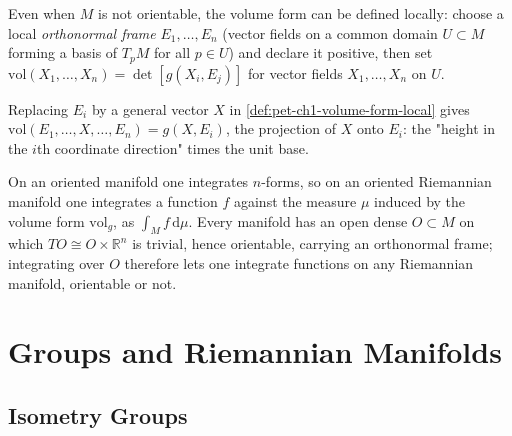 \begin{definition}
  \label{def:pet-ch1-volume-form-local}
  \leanok
  Even when $M$ is not orientable, the volume form can be defined locally: choose
  a local \emph{orthonormal frame} $E_1,\dots,E_n$ (vector fields on a common
  domain $U\subset M$ forming a basis of $T_pM$ for all $p\in U$) and declare it
  positive, then set $\mathrm{vol}(X_1,\dots,X_n)=\det[g(X_i,E_j)]$ for vector fields
  $X_1,\dots,X_n$ on $U$.
\end{definition}

\begin{remark}
  \label{rem:pet-ch1-height-base}
  \leanok
  Replacing $E_i$ by a general vector $X$ in \cref{def:pet-ch1-volume-form-local}
  gives $\mathrm{vol}(E_1,\dots,X,\dots,E_n)=g(X,E_i)$, the projection of $X$ onto
  $E_i$: the "height in the $i$th coordinate direction" times the unit base.
\end{remark}

\begin{remark}
  \label{rem:pet-ch1-integration-riemannian}
  \leanok
  On an oriented manifold one integrates $n$-forms, so on an oriented Riemannian
  manifold one integrates a function $f$ against the measure $\mu$ induced by the
  volume form $\mathrm{vol}_g$, as $\int_M f\,\mathrm{d}\mu$. Every manifold has an
  open dense $O\subset M$ on which $TO\cong O\times\mathbb{R}^n$ is trivial, hence
  orientable, carrying an orthonormal frame; integrating over $O$ therefore lets
  one integrate functions on any Riemannian manifold, orientable or not.
\end{remark}

\section{Groups and Riemannian Manifolds}

\subsection{Isometry Groups}

